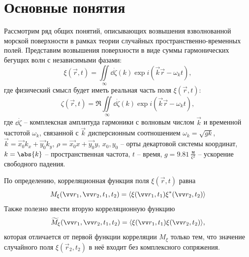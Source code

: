 \section{Основные понятия}
Рассмотрим ряд общих понятий, описывающих возвышения  взволнованной морской поверхности в рамках теории случайных пространственно-временных полей. Представим возвышения поверхности в виде суммы гармонических бегущих волн с независимыми фазами:
\begin{equation}
	\label{eq:0}
	\xi(\vec r,t)= \iint\limits_{\infty} \dd{\dot \zeta(k)} \exp{i(\vec k \vec r - \omega_k t)}, 
\end{equation}
где физический смысл будет иметь реальная часть поля $\xi(\vec r,t)$: 
\begin{equation}
	\label{eq:1}
	\zeta(\vec r, t)=\Re \iint\limits_{\infty} \dd{\dot \zeta(k)} \exp{i(\vec k \vec r - \omega_k t)}, 
\end{equation}
где $\dd{\dot \zeta}$ -- комплексная амплитуда гармоники с волновым числом $\vec k$  и временной частотой $\omega_k$, связанной с $\vec k$ дисперсионным соотношением $\omega_k=\sqrt{g k }$, $\vec{k}=\vec{x_0} k_x + \vec{y_0} k_y$, $\rho=\vec{x_0} x + \vec{y_0} y$,
$x_0,y_0$ -- орты декартовой системы координат, $k=\abs{k}$ -- пространственная частота, $t$ -- время, $g=9.81 ~ \frac{\text{м}}{\text{с}^2}$ -- ускорение свободного падения.

По определению, корреляционная функция поля $\xi(\vec r,t)$ равна
\begin{equation}
 	M_{\xi}(\vec{r_1},\vec{r_2},t_1,t_2)=\mean{\xi(\vec r_1,t_1) \xi^*(\vec r_2,t_2)}
 \end{equation} 
Также полезно ввести вторую корреляционную функцию
\begin{equation}
	\tM_{\xi}(\vec{r_1},\vec{r_2},t_1,t_2)=\mean{\xi(\vec r_1,t_1) \xi(\vec r_2,t_2)},
\end{equation}
которая отличается от первой функции корреляции $M_{\xi}$ только тем, что значение случайного поля $\xi(\vec r_2, t_2)$ в неё входит без комплексного сопряжения. 

